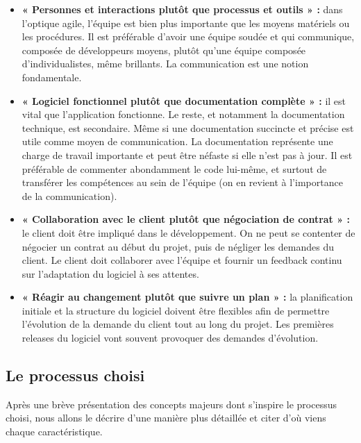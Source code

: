 \begin{itemize}
        \item [\textbullet] \textbf{« Personnes et interactions plutôt que
            processus et outils » :} dans l’optique agile, l’équipe est bien
            plus importante que les moyens matériels ou les procédures. Il est
            préférable d’avoir une équipe soudée et qui communique, composée de
            développeurs moyens, plutôt qu’une équipe composée
            d’individualistes, même brillants. La communication est une notion
            fondamentale.
        \item [\textbullet] \textbf{« Logiciel fonctionnel plutôt que
            documentation complète » :} il est vital que l’application
            fonctionne. Le reste, et notamment la documentation technique, est
            secondaire. Même si une documentation succincte et précise est utile
            comme moyen de communication. La documentation représente une charge
            de travail importante et peut être néfaste si elle n’est pas à jour.
            Il est préférable de commenter abondamment le code lui-même, et
            surtout de transférer les compétences au sein de l’équipe (on en
            revient à l’importance de la communication).
        \item [\textbullet] \textbf{« Collaboration avec le client plutôt que
            négociation de contrat » :} le client doit être impliqué dans le
            développement. On ne peut se contenter de négocier un contrat au
            début du projet, puis de négliger les demandes du client. Le client
            doit collaborer avec l’équipe et fournir un feedback continu sur
            l’adaptation du logiciel à ses attentes.
        \item [\textbullet] \textbf{« Réagir au changement plutôt que suivre un
            plan » :} la planification initiale et la structure du logiciel
            doivent être flexibles afin de permettre l’évolution de la demande
            du client tout au long du projet. Les premières releases du logiciel
            vont souvent provoquer des demandes d’évolution\cite{5}. 
\end{itemize}
    
\subsection{Le processus choisi }
Après une brève présentation des concepts majeurs dont s’inspire le processus
choisi, nous allons le décrire d’une manière plus détaillée et citer d’où viens
chaque caractéristique.

